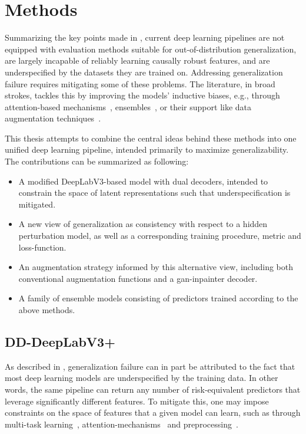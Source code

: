 \chapter{Methods}\label{methods}
Summarizing the key points made in , current deep learning pipelines are not equipped with evaluation methods suitable for out-of-distribution generalization, are largely incapable of reliably learning causally robust features, and are underspecified by the datasets they are trained on. Addressing generalization failure requires mitigating some of these problems. The literature, in broad strokes, tackles this by improving the models' inductive biases, e.g., through attention-based mechanisms~\cite{attention_generalizability, reverse_attention}, ensembles~\cite{divergentnets, endoensemble}, or their support like data augmentation techniques~\cite{polyp_augmentation, cyclegan}. 

This thesis attempts to combine the central ideas behind these methods into one unified deep learning pipeline, intended primarily to maximize generalizability. The contributions can be summarized as following:

\begin{itemize}
    \item A modified DeepLabV3-based model with dual decoders, intended to constrain the space of latent representations such that underspecification is mitigated.
    \item A new view of generalization as consistency with respect to a hidden perturbation model, as well as a corresponding training procedure, metric and loss-function.
    \item An augmentation strategy informed by this alternative view, including both conventional augmentation functions and a \gls{gan}-inpainter decoder.
    \item A family of ensemble models consisting of predictors trained according to the above methods.
\end{itemize}

\section{DD-DeepLabV3+}
As described in , generalization failure can in part be attributed to the fact that most deep learning models are underspecified by the training data. In other words, the same pipeline can return any number of risk-equivalent predictors that leverage significantly different features. To mitigate this, one may impose constraints on the space of features that a given model can learn, such as through multi-task learning~\cite{ddanet}, attention-mechanisms~\cite{attention_generalizability, reverse_attention} and preprocessing~\cite{visual_cortex}. 

